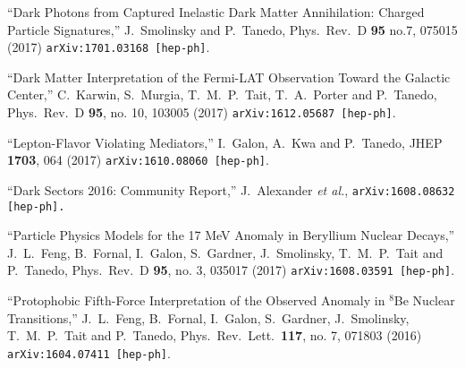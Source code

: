 \documentclass[margin,line]{resume}
\begin{document}
\begin{resume}
``Dark Photons from Captured Inelastic Dark Matter Annihilation: Charged Particle Signatures,''
  J.~Smolinsky and P.~Tanedo,
  Phys.\ Rev.\ D {\bf 95} no.7,  075015 (2017)
  \texttt{arXiv:1701.03168 [hep-ph]}.  
  \vspace{-2mm}

  ``Dark Matter Interpretation of the Fermi-LAT Observation Toward the Galactic Center,''
  C.~Karwin, S.~Murgia, T.~M.~P.~Tait, T.~A.~Porter and P.~Tanedo,
  Phys.\ Rev.\ D {\bf 95}, no. 10, 103005 (2017)
  \texttt{arXiv:1612.05687 [hep-ph]}.
	\vspace{-2mm}

    
  ``Lepton-Flavor Violating Mediators,''
  I.~Galon, A.~Kwa and P.~Tanedo,
  JHEP {\bf 1703}, 064 (2017)
  \texttt{arXiv:1610.08060 [hep-ph]}.
	\vspace{-2mm}
  
``Dark Sectors 2016:%
 Community Report,'' 
  J.~Alexander {\it et al.},
  \texttt{arXiv:1608.08632 [hep-ph].}
  \vspace{-2mm}

``Particle Physics Models for the 17 MeV Anomaly in Beryllium Nuclear Decays,''
  J.~L.~Feng, B.~Fornal, I.~Galon, S.~Gardner, J.~Smolinsky, T.~M.~P.~Tait and P.~Tanedo,
  Phys.\ Rev.\ D {\bf 95}, no. 3, 035017 (2017)
  \texttt{arXiv:1608.03591 [hep-ph]}.
    \vspace{-2mm}
  
``Protophobic Fifth-Force Interpretation of the Observed Anomaly in $^8$Be Nuclear Transitions,''  
J.~L.~Feng, B.~Fornal, I.~Galon, S.~Gardner, J.~Smolinsky, T.~M.~P.~Tait and P.~Tanedo,
  Phys.\ Rev.\ Lett.\  {\bf 117}, no. 7, 071803 (2016)
  \texttt{arXiv:1604.07411 [hep-ph]}.
  \vspace{-2mm}
  

\end{resume}
\end{document}
